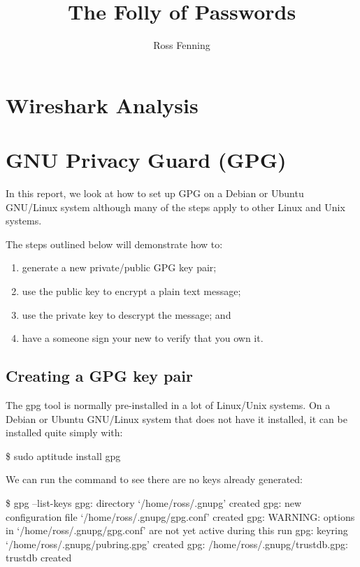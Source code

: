 \documentclass{report}
\title{The Folly of Passwords}
\author{Ross Fenning}
\begin{document}
\maketitle
\tableofcontents

\chapter{Wireshark Analysis}

\chapter{GNU Privacy Guard (GPG)}

In this report, we look at how to set up GPG on a Debian or Ubuntu GNU/Linux
system although many of the steps apply to other Linux and Unix systems.

The steps outlined below will demonstrate how to:

\begin{enumerate}
\item generate a new private/public GPG key pair;
\item use the public key to encrypt a plain text message;
\item use the private key to descrypt the message; and
\item have a someone sign your new to verify that you own it.
\end{enumerate}

\section{Creating a GPG key pair}

The gpg tool is normally pre-installed in a lot of Linux/Unix systems. On
a Debian or Ubuntu GNU/Linux system that does not have it installed, it
can be installed quite simply with:

\begin{listing}
\$ sudo aptitude install gpg
\end{listing}

We can run the command to see there are no keys already generated:

\begin{listing}
  \$ gpg --list-keys
  gpg: directory `/home/ross/.gnupg' created
  gpg: new configuration file `/home/ross/.gnupg/gpg.conf' created
  gpg: WARNING: options in `/home/ross/.gnupg/gpg.conf' are not yet active during this run
  gpg: keyring `/home/ross/.gnupg/pubring.gpg' created
  gpg: /home/ross/.gnupg/trustdb.gpg: trustdb created
\end{listing}
\end{document}
